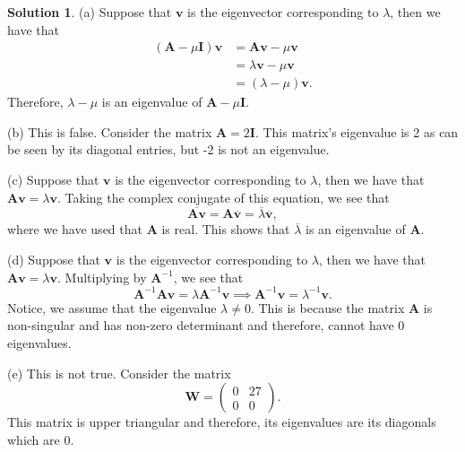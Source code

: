 \documentclass[12pt]{article}
\renewcommand{\vec}[1]{\mathbf{#1}}
\theoremstyle{definition}
\newtheorem{sol}{Solution}
\theoremstyle{remark}
\begin{document}
\begin{sol}\leavevmode

(a) Suppose that $\vec{v}$ is the eigenvector corresponding to $\lambda$, then we have that 
    \begin{align*}
        (\vec{A}-\mu \vec{I}) \vec{v} &= \vec{A}\vec{v} - \mu \vec{v}\\
                                      &= \lambda \vec{v} - \mu \vec{v} \\
                                      &= (\lambda-\mu) \vec{v}.
    \end{align*}
    Therefore, $\lambda-\mu$ is an eigenvalue of $\vec{A}-\mu \vec{I}$.

(b) This is false. Consider the matrix $\vec{A} = 2 \vec{I}$. This matrix's eigenvalue is 2 as can be seen by its diagonal entries, but -2 is not an eigenvalue.

(c)  Suppose that $\vec{v}$ is the eigenvector corresponding to $\lambda$, then we have that $\vec{A} \vec{v} = \lambda \vec{v}$. Taking the complex conjugate of this equation, we see that
\begin{equation*}
\overline{ \vec{A} \vec{v} } = \vec{A} \overline{ \vec{v} } = \overline{\lambda} \overline{\vec{v}},
\end{equation*}
where we have used that $\vec{A}$ is real. This shows that $\overline{\lambda}$ is an eigenvalue of $\vec{A}$.

(d)  Suppose that $\vec{v}$ is the eigenvector corresponding to $\lambda$, then we have that $\vec{A} \vec{v} = \lambda \vec{v}$. Multiplying by $\vec{A}^{-1}$, we see that
\begin{equation*}
    \vec{A}^{-1} \vec{A} \vec{v} = \lambda \vec{A}^{-1} \vec{v} \implies \vec{A}^{-1} \vec{v} = \lambda^{-1}\vec{v}.
\end{equation*}
Notice, we assume that the eigenvalue $\lambda\neq 0$. This is because the matrix $\vec{A}$ is non-singular and has non-zero determinant and therefore, cannot have 0 eigenvalues.

(e) This is not true. Consider the matrix 
\begin{equation*}
    \vec{W} = \begin{pmatrix}
        0 & 27 \\
        0 & 0
    \end{pmatrix}.
\end{equation*}
This matrix is upper triangular and therefore, its eigenvalues are its diagonals which are 0.


\end{sol}
\end{document}
